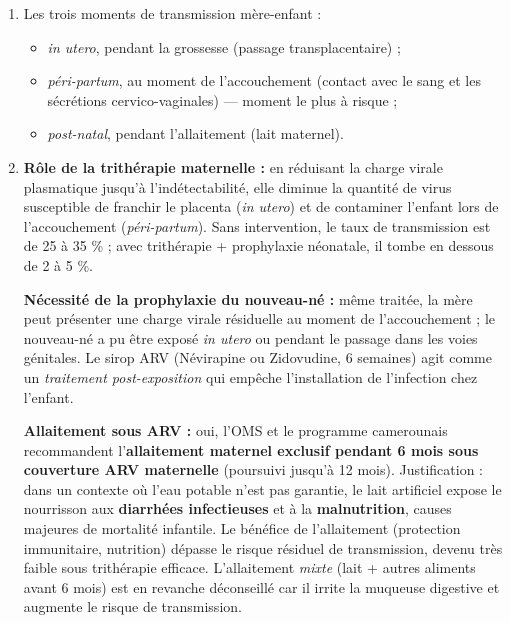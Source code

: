 \documentclass[11pt]{article}
\begin{document}
\begin{corrige}
\begin{enumerate}
    \item Les trois moments de transmission mère-enfant :
    \begin{itemize}
        \item \emph{in utero}, pendant la grossesse (passage transplacentaire) ;
        \item \emph{péri-partum}, au moment de l'accouchement (contact avec le sang et les sécrétions cervico-vaginales) — moment le plus à risque ;
        \item \emph{post-natal}, pendant l'allaitement (lait maternel).
    \end{itemize}
    \item \textbf{Rôle de la trithérapie maternelle :} en réduisant la charge virale plasmatique jusqu'à l'indétectabilité, elle diminue la quantité de virus susceptible de franchir le placenta (\emph{in utero}) et de contaminer l'enfant lors de l'accouchement (\emph{péri-partum}). Sans intervention, le taux de transmission est de 25 à 35 \% ; avec trithérapie + prophylaxie néonatale, il tombe en dessous de 2 à 5 \%.
    
    \textbf{Nécessité de la prophylaxie du nouveau-né :} même traitée, la mère peut présenter une charge virale résiduelle au moment de l'accouchement ; le nouveau-né a pu être exposé \emph{in utero} ou pendant le passage dans les voies génitales. Le sirop ARV (Névirapine ou Zidovudine, 6 semaines) agit comme un \emph{traitement post-exposition} qui empêche l'installation de l'infection chez l'enfant.
    
    \textbf{Allaitement sous ARV :} oui, l'OMS et le programme camerounais recommandent l'\textbf{allaitement maternel exclusif pendant 6 mois sous couverture ARV maternelle} (poursuivi jusqu'à 12 mois). Justification : dans un contexte où l'eau potable n'est pas garantie, le lait artificiel expose le nourrisson aux \textbf{diarrhées infectieuses} et à la \textbf{malnutrition}, causes majeures de mortalité infantile. Le bénéfice de l'allaitement (protection immunitaire, nutrition) dépasse le risque résiduel de transmission, devenu très faible sous trithérapie efficace. L'allaitement \emph{mixte} (lait + autres aliments avant 6 mois) est en revanche déconseillé car il irrite la muqueuse digestive et augmente le risque de transmission.
\end{enumerate}
\end{corrige}
\end{document}
